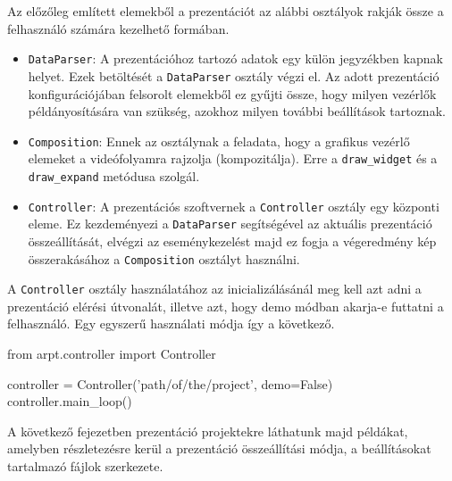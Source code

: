 
Az előzőleg említett elemekből a prezentációt az alábbi osztályok rakják össze a felhasználó számára kezelhető formában.
\begin{itemize}
\item \texttt{DataParser}: A prezentációhoz tartozó adatok egy külön jegyzékben kapnak helyet. Ezek betöltését a \texttt{DataParser} osztály végzi el. Az adott prezentáció konfigurációjában felsorolt elemekből ez gyűjti össze, hogy milyen vezérlők példányosítására van szükség, azokhoz milyen további beállítások tartoznak.
\item \texttt{Composition}: Ennek az osztálynak a feladata, hogy a grafikus vezérlő elemeket a videófolyamra rajzolja (kompozitálja). Erre a \texttt{draw\_widget} és a \texttt{draw\_expand} metódusa szolgál.
\item \texttt{Controller}: A prezentációs szoftvernek a \texttt{Controller} osztály egy központi eleme. Ez kezdeményezi a \texttt{DataParser} segítségével az aktuális prezentáció összeállítását, elvégzi az eseménykezelést majd ez fogja a végeredmény kép összerakásához a \texttt{Composition} osztályt használni.
\end{itemize}

A \texttt{Controller} osztály használatához az inicializálásánál meg kell azt adni a prezentáció elérési útvonalát, illetve azt, hogy demo módban akarja-e futtatni a felhasználó.
Egy egyszerű használati módja így a következő.
\begin{python}
from arpt.controller import Controller

controller = Controller('path/of/the/project', demo=False)
controller.main_loop()
\end{python}
A következő fejezetben prezentáció projektekre láthatunk majd példákat, amelyben részletezésre kerül a prezentáció összeállítási módja, a beállításokat tartalmazó fájlok szerkezete.
